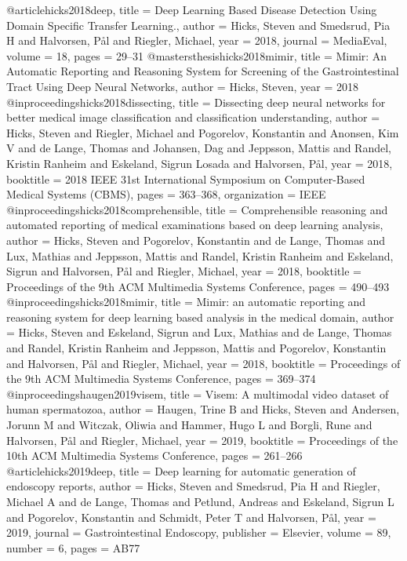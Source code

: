 @article{hicks2018deep,
	title = {Deep Learning Based Disease Detection Using Domain Specific Transfer Learning.},
	author = {Hicks, Steven and Smedsrud, Pia H and Halvorsen, P{\aa}l and Riegler, Michael},
	year = 2018,
	journal = {MediaEval},
	volume = 18,
	pages = {29--31}
}
@mastersthesis{hicks2018mimir,
	title = {Mimir: An Automatic Reporting and Reasoning System for Screening of the Gastrointestinal Tract Using Deep Neural Networks},
	author = {Hicks, Steven},
	year = 2018
}
@inproceedings{hicks2018dissecting,
	title = {Dissecting deep neural networks for better medical image classification and classification understanding},
	author = {Hicks, Steven and Riegler, Michael and Pogorelov, Konstantin and Anonsen, Kim V and de Lange, Thomas and Johansen, Dag and Jeppsson, Mattis and Randel, Kristin Ranheim and Eskeland, Sigrun Losada and Halvorsen, P{\aa}l},
	year = 2018,
	booktitle = {2018 IEEE 31st International Symposium on Computer-Based Medical Systems (CBMS)},
	pages = {363--368},
	organization = {IEEE}
}
@inproceedings{hicks2018comprehensible,
	title = {Comprehensible reasoning and automated reporting of medical examinations based on deep learning analysis},
	author = {Hicks, Steven and Pogorelov, Konstantin and de Lange, Thomas and Lux, Mathias and Jeppsson, Mattis and Randel, Kristin Ranheim and Eskeland, Sigrun and Halvorsen, P{\aa}l and Riegler, Michael},
	year = 2018,
	booktitle = {Proceedings of the 9th ACM Multimedia Systems Conference},
	pages = {490--493}
}
@inproceedings{hicks2018mimir,
	title = {Mimir: an automatic reporting and reasoning system for deep learning based analysis in the medical domain},
	author = {Hicks, Steven and Eskeland, Sigrun and Lux, Mathias and de Lange, Thomas and Randel, Kristin Ranheim and Jeppsson, Mattis and Pogorelov, Konstantin and Halvorsen, P{\aa}l and Riegler, Michael},
	year = 2018,
	booktitle = {Proceedings of the 9th ACM Multimedia Systems Conference},
	pages = {369--374}
}
@inproceedings{haugen2019visem,
	title = {Visem: A multimodal video dataset of human spermatozoa},
	author = {Haugen, Trine B and Hicks, Steven and Andersen, Jorunn M and Witczak, Oliwia and Hammer, Hugo L and Borgli, Rune and Halvorsen, P{\aa}l and Riegler, Michael},
	year = 2019,
	booktitle = {Proceedings of the 10th ACM Multimedia Systems Conference},
	pages = {261--266}
}
@article{hicks2019deep,
	title = {Deep learning for automatic generation of endoscopy reports},
	author = {Hicks, Steven and Smedsrud, Pia H and Riegler, Michael A and de Lange, Thomas and Petlund, Andreas and Eskeland, Sigrun L and Pogorelov, Konstantin and Schmidt, Peter T and Halvorsen, P{\aa}l},
	year = 2019,
	journal = {Gastrointestinal Endoscopy},
	publisher = {Elsevier},
	volume = 89,
	number = 6,
	pages = {AB77}
}
